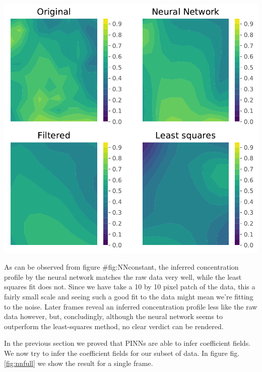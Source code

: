 \documentclass{Dissertate}
\let\origfigure\figure
\let\endorigfigure\endfigure
\renewenvironment{figure}[1][2] {
    \expandafter\origfigure\expandafter[H]
} {
    \endorigfigure
}
\begin{document}
\begin{figure}
\hypertarget{fig:nnconstant}{%
\centering
\includegraphics{source/figures/pdf/NN_Man_constant.pdf}
\caption{Caption.}\label{fig:nnconstant}
}
\end{figure}

As can be observed from figure \#fig:NNconstant, the inferred
concentration profile by the neural network matches the raw data very
well, while the least squares fit does not. Since we have take a 10 by
10 pixel patch of the data, this a fairly small scale and seeing such a
good fit to the data might mean we're fitting to the noise. Later frames
reveal an inferred concentration profile less like the raw data however,
but, concludingly, although the neural network seems to outperform the
least-squares method, no clear verdict can be rendered.

In the previous section we proved that PINNs are able to infer
coefficient fields. We now try to infer the coefficient fields for our
subset of data. In figure fig.\ref{fig:nnfull} we show the result for a
single frame.
\end{document}
